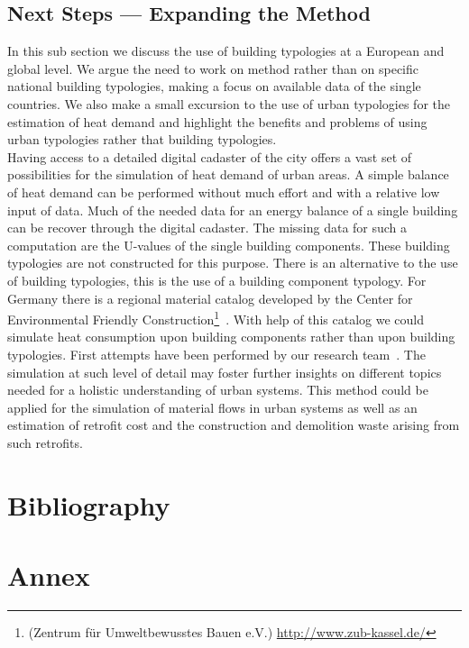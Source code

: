 \documentclass[authoryear,preprint,review,12pt]{elsarticle}
\begin{document}
\begin{linenumbers}
\subsection{Next Steps --- Expanding the Method}\label{sub-section:next}

In this sub section we discuss the use of building typologies at a European
and global level. We argue the need to work on method rather than on specific
national building typologies, making a focus on available data of the single
countries.  We also make a small excursion to the use of urban typologies for
the estimation of heat demand and highlight the benefits and problems of using
urban typologies rather that building typologies.\\

Having access to a detailed digital cadaster of the city offers a vast set of
possibilities for the simulation of heat demand of urban areas.  A simple
balance of heat demand can be performed without much effort and with a relative
low input of data.  Much of the needed data for an energy balance of a single
building can be recover through the digital cadaster.  The missing data for
such a computation are the U-values of the single building components.  These
building typologies are not constructed for this purpose.  There is an
alternative to the use of building typologies, this is the use of a building
component typology.  For Germany there is a regional material catalog developed
by the Center for Environmental Friendly Construction\footnote{(Zentrum für
    Umweltbewusstes Bauen e.V.)
    \url{http://www.zub-kassel.de/}}~\cite{Klauss.2009}.
With help of this catalog we could simulate heat consumption upon building
components rather than upon building typologies.  First attempts have been
performed by our research team~\cite{Munoz.2014c}. The simulation at such level of
detail may foster further insights on different topics needed for a holistic
understanding of urban systems.  This method could be applied for the
simulation of material flows in urban systems as well as an estimation of
retrofit cost and the construction and demolition waste arising from such
retrofits.\\


\section*{Bibliography}
 
%


\section*{Annex}


\end{linenumbers}
\end{document}
